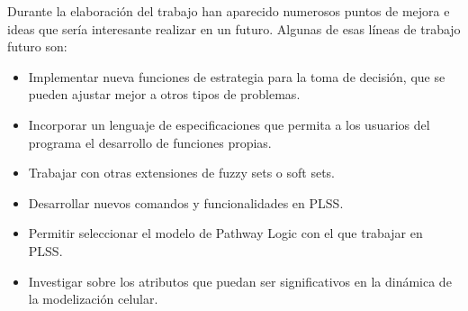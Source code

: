 Durante la elaboración del trabajo han aparecido numerosos puntos de mejora e ideas que sería interesante realizar en un futuro. 
Algunas de esas líneas de trabajo futuro son:
\begin{itemize}
\item Implementar nueva funciones de estrategia para la toma de decisión, que se pueden ajustar mejor a otros tipos de problemas.

\item Incorporar un lenguaje de especificaciones que permita a los usuarios del programa el desarrollo de funciones propias.

\item Trabajar con otras extensiones de fuzzy sets o soft sets.

\item Desarrollar nuevos comandos y funcionalidades en PLSS.

\item Permitir seleccionar el modelo de Pathway Logic con el que trabajar en PLSS.

\item Investigar sobre los atributos que puedan ser significativos en la dinámica de la modelización celular.
\end{itemize}


